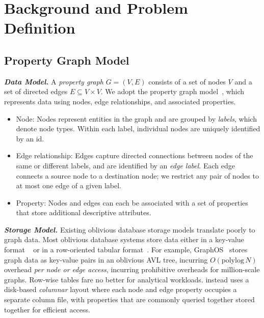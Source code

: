 \section{Background and Problem Definition}
\label{sec:background}

\subsection{Property Graph Model}
\label{sec:background:graph}


\noindent\textit{\textbf{Data Model.}} A \emph{property graph} $G = (V, E)$ consists of a set of nodes $V$ and a set of directed 
edges $E \subseteq V \times V$. We adopt the property graph model~\cite{robinson2015graph}, 
which represents data using nodes, edge relationships, and associated properties.

\begin{itemize}[leftmargin=*]
\item {Node:} Nodes represent entities in the graph and are grouped by \textit{labels}, 
which denote node types. Within each label, individual nodes are uniquely identified by an id.

\item {Edge relationship:} Edges capture directed connections between nodes 
    of the same or different labels, and are identified by an \emph{edge 
    label}. Each edge connects a source node to a destination node; we restrict any pair of nodes to at most one edge of a given label.

\item {Property:} Nodes and edges can each be associated with a set of properties that store additional descriptive attributes.
\end{itemize}


\noindent\textit{\textbf{Storage Model.}} 
Existing oblivious database storage models translate poorly to graph data. Most oblivious database systems store data either in a key-value format 
~\cite{dauterman2021snoopy, mishra2018oblix} or in a row-oriented tabular 
format~\cite{zheng2017opaque,eskandarian2019oblidb,mavrogiannakis2025obliviator}. For example, 
GraphOS~\cite{chamani2023graphos} stores graph data as key-value pairs in an oblivious AVL tree, 
incurring $O(\mathrm{polylog}\,N)$ overhead \emph{per node or edge access}, incurring prohibitive overheads for million-scale graphs. Row-wise tables fare no better for 
analytical workloads. \system instead uses a disk-based \emph{columnar} layout where
each node and edge property occupies a separate column file, with properties 
that are commonly queried together stored together for efficient access.


